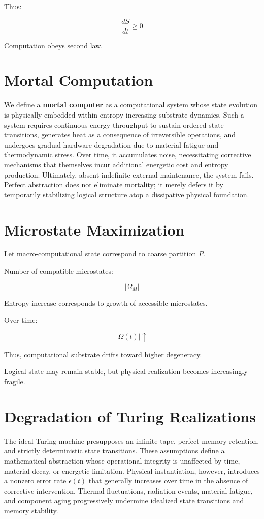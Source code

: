 \documentclass[11pt,openany]{book}
\begin{document}
Thus:

\[
\frac{dS}{dt} \geq 0
\]

Computation obeys second law.

\section{Mortal Computation}

We define a \textbf{mortal computer} as a computational system whose state evolution is physically embedded within entropy-increasing substrate dynamics. Such a system requires continuous energy throughput to sustain ordered state transitions, generates heat as a consequence of irreversible operations, and undergoes gradual hardware degradation due to material fatigue and thermodynamic stress. Over time, it accumulates noise, necessitating corrective mechanisms that themselves incur additional energetic cost and entropy production. Ultimately, absent indefinite external maintenance, the system fails. Perfect abstraction does not eliminate mortality; it merely defers it by temporarily stabilizing logical structure atop a dissipative physical foundation. 

\section{Microstate Maximization}

Let macro-computational state correspond to coarse partition $P$.

Number of compatible microstates:

\[
|\Omega_M|
\]

Entropy increase corresponds to growth of accessible microstates.

Over time:

\[
|\Omega(t)| \uparrow
\]

Thus, computational substrate drifts toward higher degeneracy.

Logical state may remain stable,
but physical realization becomes increasingly fragile.

\section{Degradation of Turing Realizations}

The ideal Turing machine presupposes an infinite tape, perfect memory retention, 
and strictly deterministic state transitions. These assumptions define a 
mathematical abstraction whose operational integrity is unaffected by time, 
material decay, or energetic limitation. Physical instantiation, however, 
introduces a nonzero error rate $\epsilon(t)$ that generally increases over time 
in the absence of corrective intervention. Thermal fluctuations, radiation events, 
material fatigue, and component aging progressively undermine idealized state 
transitions and memory stability. 
\end{document}

